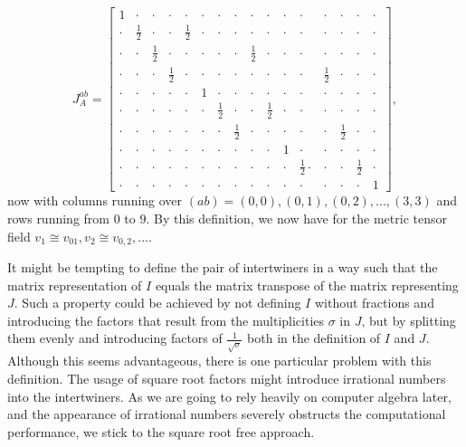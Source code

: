 \begin{equation}\label{interJMet}
J^{ab}_{A} = \begin{bmatrix} 
                1 & \cdot & \cdot & \cdot & \cdot & \cdot & \cdot & \cdot & \cdot & \cdot & \cdot & \cdot & \cdot & \cdot & \cdot & \cdot \\
                \cdot & \frac{1}{2} & \cdot & \cdot & \frac{1}{2} & \cdot & \cdot & \cdot & \cdot & \cdot & \cdot & \cdot & \cdot & \cdot & \cdot & \cdot  \\
                \cdot & \cdot & \frac{1}{2} & \cdot & \cdot & \cdot & \cdot & \cdot & \frac{1}{2} & \cdot & \cdot & \cdot & \cdot & \cdot & \cdot & \cdot  \\
                \cdot & \cdot & \cdot & \frac{1}{2} & \cdot & \cdot & \cdot & \cdot & \cdot & \cdot & \cdot & \cdot & \frac{1}{2} & \cdot & \cdot & \cdot  \\
                \cdot & \cdot & \cdot & \cdot & \cdot & 1 & \cdot & \cdot & \cdot & \cdot & \cdot & \cdot & \cdot & \cdot & \cdot & \cdot  \\
                \cdot & \cdot & \cdot & \cdot & \cdot & \cdot & \frac{1}{2} & \cdot & \cdot & \frac{1}{2} & \cdot & \cdot & \cdot & \cdot & \cdot & \cdot  \\
                \cdot & \cdot & \cdot & \cdot & \cdot & \cdot & \cdot & \frac{1}{2} & \cdot & \cdot & \cdot & \cdot & \cdot & \frac{1}{2} & \cdot & \cdot  \\
                \cdot & \cdot & \cdot & \cdot & \cdot & \cdot & \cdot & \cdot & \cdot & \cdot & 1 & \cdot & \cdot & \cdot & \cdot & \cdot  \\
                \cdot & \cdot & \cdot & \cdot & \cdot & \cdot & \cdot & \cdot & \cdot & \cdot & \cdot & \frac{1}{2} \cdot & \cdot & \cdot & \frac{1}{2} & \cdot  \\
                \cdot & \cdot & \cdot & \cdot & \cdot & \cdot & \cdot & \cdot & \cdot & \cdot & \cdot & \cdot & \cdot & \cdot & \cdot & 1  
            \end{bmatrix},
\end{equation}
now with columns running over $(ab)={(0,0),(0,1),(0,2),...,(3,3)}$ and rows running from $0$ to $9$. By this definition, we now have for the metric tensor field $v_1 \cong v_{01}, v_2 \cong v_{0,2},...$.
\begin{remark}
It might be tempting to define the pair of intertwiners in a way such that the matrix representation of $I$ equals the matrix transpose of the matrix representing $J$. Such a property could be achieved by not defining $I$ without fractions and introducing the factors that result from the multiplicities $\sigma$ in $J$, but by splitting them evenly and introducing factors of $\frac{1}{\sqrt{\sigma}}$ both in the definition of $I$ and $J$. Although this seems advantageous, there is one particular problem with this definition. The usage of square root factors might introduce irrational numbers into the intertwiners. As we are going to rely heavily on computer algebra later, and the appearance of irrational numbers severely obstructs the computational performance, we stick to the square root free approach.  
\end{remark}

